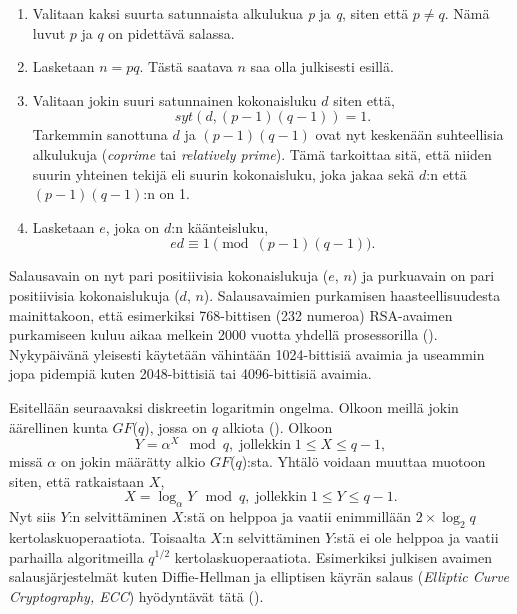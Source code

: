   \begin{enumerate}
  
      \item Valitaan kaksi suurta satunnaista alkulukua \emph{p} ja \emph{q}, siten että $p \neq q$. Nämä luvut $p$ ja $q$ on pidettävä salassa.
      
      \item Lasketaan $n = pq$. Tästä saatava $n$ saa olla julkisesti esillä.
      
      \item Valitaan jokin suuri satunnainen kokonaisluku $d$ siten että,
      \[syt(d, (p-1)(q-1)) = 1.\]
      Tarkemmin sanottuna $d$ ja $(p-1)(q-1)$ ovat nyt keskenään suhteellisia alkulukuja (\emph{coprime} tai \emph{relatively prime}). Tämä tarkoittaa sitä, että niiden suurin yhteinen tekijä eli suurin kokonaisluku, joka jakaa sekä $d$:n että $(p-1)(q-1)$:n on 1.
      
      \item Lasketaan $e$, joka on $d$:n käänteisluku,
      \[e d \equiv 1 \pmod{(p-1) (q-1)}.\]
  \end{enumerate}
  Salausavain on nyt pari positiivisia kokonaislukuja ($e$, $n$) ja purkuavain on pari positiivisia kokonaislukuja ($d$, $n$). Salausavaimien purkamisen haasteellisuudesta mainittakoon, että esimerkiksi 768-bittisen (232 numeroa) RSA-avaimen purkamiseen kuluu aikaa melkein 2000 vuotta yhdellä prosessorilla (\cite{buchmann2016post}). Nykypäivänä yleisesti käytetään vähintään 1024-bittisiä avaimia ja useammin jopa pidempiä kuten 2048-bittisiä tai 4096-bittisiä avaimia.
  
 Esitellään seuraavaksi diskreetin logaritmin ongelma. Olkoon meillä jokin äärellinen kunta $GF$($q$), jossa on $q$ alkiota (\cite{1055638}). Olkoon
 \begin{equation}
     \label{eq10}
     Y = \alpha^{X} \mod q, \; \text{jollekkin} \; 1 \leq X \leq q-1,
 \end{equation}
 missä $\alpha$ on jokin määrätty alkio $GF$($q$):sta. Yhtälö voidaan muuttaa muotoon siten, että ratkaistaan $X$, 
 \begin{equation}
     \label{eq11}
     X = \log_{\alpha} Y \mod q, \; \text{jollekkin} \; 1 \leq Y \leq q-1.
 \end{equation}
 Nyt siis $Y$:n selvittäminen $X$:stä on helppoa ja vaatii enimmillään $2 \times \log_{2}q$ kertolaskuoperaatiota. Toisaalta $X$:n selvittäminen $Y$:stä ei ole helppoa ja vaatii parhailla algoritmeilla $q^{1/2}$ kertolaskuoperaatiota. Esimerkiksi julkisen avaimen salausjärjestelmät kuten Diffie-Hellman ja elliptisen käyrän salaus (\emph{Elliptic Curve Cryptography, ECC}) hyödyntävät tätä (\cite{mavroeidis2018impact}).
 
